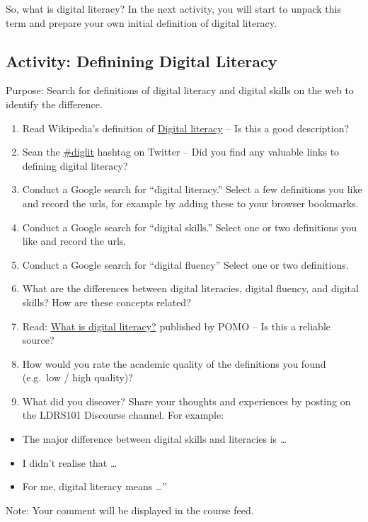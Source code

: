 \documentclass[
]{book}
\providecommand{\tightlist}{%
  \setlength{\itemsep}{0pt}\setlength{\parskip}{0pt}}
\theoremstyle{definition}
\theoremstyle{definition}
\theoremstyle{definition}
\theoremstyle{definition}
\theoremstyle{remark}
\begin{document}
So, what is digital literacy? In the next activity, you will start to unpack this term and prepare your own initial definition of digital literacy.

\hypertarget{activity-definining-digital-literacy}{%
\subsection*{Activity: Definining Digital Literacy}\label{activity-definining-digital-literacy}}

\begin{reflect}
Purpose: Search for definitions of digital literacy and digital skills on the web to identify the difference.

\begin{enumerate}
\def\labelenumi{\arabic{enumi}.}
\tightlist
\item
  Read Wikipedia's definition of \href{https://en.wikipedia.org/wiki/Digital_literacy}{Digital literacy} -- Is this a good description?
\item
  Scan the \href{https://twitter.com/i/flow/login?redirect_after_login=\%2Fhashtag\%2Fdiglit\%3Fs\%3D03}{\#diglit} hashtag on Twitter -- Did you find any valuable links to defining digital literacy?
\item
  Conduct a Google search for ``digital literacy.'' Select a few definitions you like and record the urls, for example by adding these to your browser bookmarks.
\item
  Conduct a Google search for ``digital skills.'' Select one or two definitions you like and record the urls.
\item
  Conduct a Google search for ``digital fluency'' Select one or two definitions.
\item
  What are the differences between digital literacies, digital fluency, and digital skills? How are these concepts related?
\item
  Read: \href{http://pomo.com.au/blog/digital-literacy/}{What is digital literacy?} published by POMO -- Is this a reliable source?
\item
  How would you rate the academic quality of the definitions you found (e.g.~low / high quality)?
\item
  What did you discover? Share your thoughts and experiences by posting on the LDRS101 Discourse channel. For example:
\end{enumerate}

\begin{itemize}
\tightlist
\item
  The major difference between digital skills and literacies is \ldots{}
\item
  I didn't realise that \ldots{}
\item
  For me, digital literacy means \ldots''
\end{itemize}

Note: Your comment will be displayed in the course feed.
\end{reflect}
\end{document}
